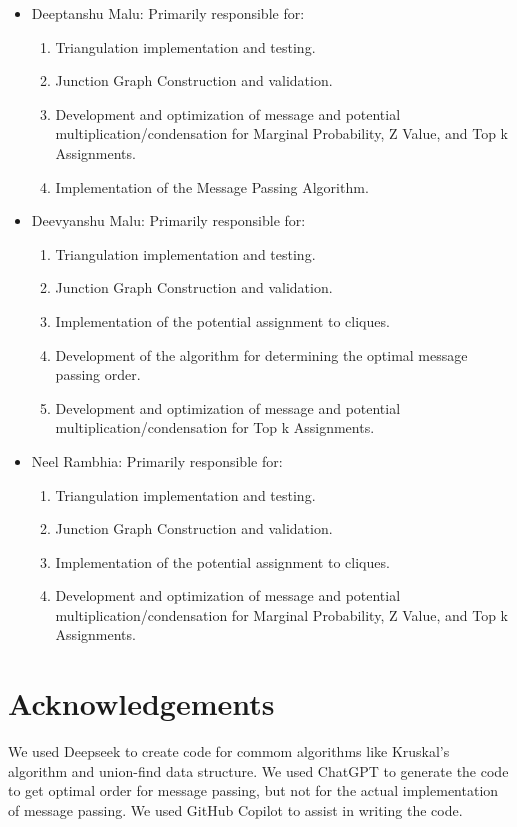 \documentclass[12pt]{article}
\begin{document}
\begin{itemize}
    \item Deeptanshu Malu: Primarily responsible for:
    \begin{enumerate}
        \item Triangulation implementation and testing.
        \item Junction Graph Construction and validation.
        \item Development and optimization of message and potential multiplication/condensation for Marginal Probability, Z Value, and Top k Assignments.
        \item Implementation of the Message Passing Algorithm.
    \end{enumerate}

    \item Deevyanshu Malu: Primarily responsible for:
    \begin{enumerate}
        \item Triangulation implementation and testing.
        \item Junction Graph Construction and validation.
        \item Implementation of the potential assignment to cliques.
        \item Development of the algorithm for determining the optimal message passing order.
        \item Development and optimization of message and potential multiplication/condensation for Top k Assignments.
    \end{enumerate}
\newpage
    \item Neel Rambhia: Primarily responsible for:
    \begin{enumerate}
        \item Triangulation implementation and testing.
        \item Junction Graph Construction and validation.
        \item Implementation of the potential assignment to cliques.
        \item Development and optimization of message and potential multiplication/condensation for Marginal Probability, Z Value, and Top k Assignments.
    \end{enumerate}
\end{itemize}

\section*{Acknowledgements}

We used Deepseek to create code for commom algorithms like Kruskal's algorithm and union-find data structure.
We used ChatGPT to generate the code to get optimal order for message passing, but not for the actual implementation of message passing.
We used GitHub Copilot to assist in writing the code.
\end{document}
